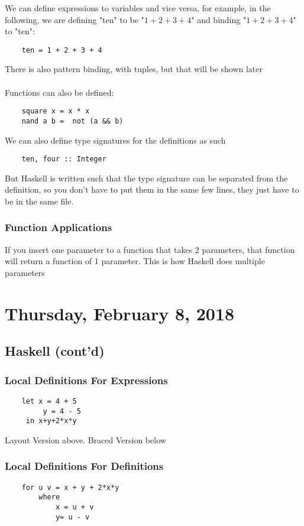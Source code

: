 \documentclass[12pt]{article}
\begin{document}
We can define expressions to variables and vice versa, for example, in the following, we are defining "ten" to be "$1+2+3+4$" and binding "$1+2+3+4$" to "ten":
\begin{lstlisting}
	ten = 1 + 2 + 3 + 4
\end{lstlisting}

There is also pattern binding, with tuples, but that will be shown later\\
\\
Functions can also be defined:

\begin{lstlisting}
	square x = x * x
	nand a b =  not (a && b)
\end{lstlisting}

We can also define type signatures for the definitions as such

\begin{lstlisting}
	ten, four :: Integer
\end{lstlisting}

But Haskell is written such that the type signature can be separated from the definition, so you don't have to put them in the same few lines, they just have to be in the same file.

\subsubsection{Function Applications}

If you insert one parameter to a function that takes 2 parameters, that function will return a function of 1 parameter. This is how Haskell does multiple parameters

\newpage

\section{Thursday, February 8, 2018}

\subsection{Haskell (cont'd)}

\subsubsection{Local Definitions For Expressions}

\begin{lstlisting}
	let x = 4 + 5
	     y = 4 - 5
	 in x+y+2*x*y
\end{lstlisting}

Layout Version above. Braced Version below

\subsubsection{Local Definitions For Definitions}

\begin{lstlisting}
	for u v = x + y + 2*x*y
		where
			x = u + v
			y= u - v
\end{lstlisting}
\end{document}

